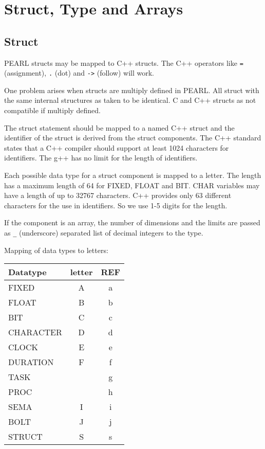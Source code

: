 \chapter{Struct, Type and Arrays}

\section{Struct}
\label{sec:struct}

PEARL structs may be mapped to C++ structs.
The C++ operators like \verb|=| (assignment), \verb|.| (dot) and 
\verb|->| (follow) will work.

One problem arises when structs are multiply defined
in PEARL. All struct with the same internal structures as
taken to be identical. C and C++ structs as not compatible
if multiply defined.

The struct statement should be mapped to a named C++ struct and the identifier
of the struct is derived from the struct components.
The C++ standard states that a C++ compiler should support at least 1024
characters for identifiers. The g++ has no limit for the length of identifiers.

Each possible data type for a struct component is mapped to a letter.
The length has a maximum length of 64 for FIXED, FLOAT and BIT. CHAR
variables may have a length of up to 32767 characters.
 C++ provides only 63 different
 characters for the use in identifiers. So we use 1-5 digits
for the length.

If the component is an array, the number of dimensions and the
 limits are
passed as \verb|_| (underscore) separated list of decimal integers
to the type.

Mapping of data types to letters:

\begin{tabular}{|l|c|c|}
\hline
Datatype & letter & REF \\
\hline
FIXED & A &a\\
FLOAT & B &b\\
BIT  & C &c\\
CHARACTER & D &d \\
CLOCK  & E &e \\
DURATION & F&f \\
TASK & & g \\
PROC  & & h \\
SEMA & I & i \\
BOLT & J & j \\
\hline
STRUCT & S &s\\
\hline
\end{tabular}

